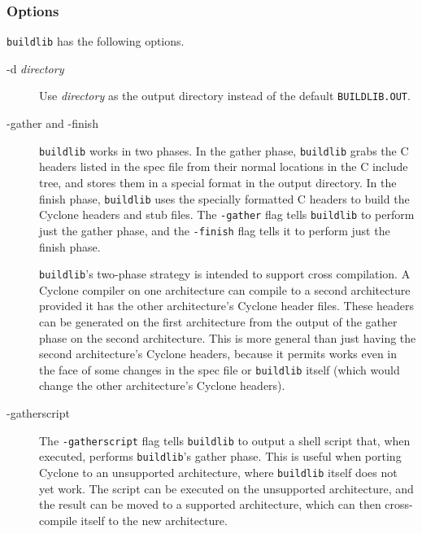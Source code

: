 \subsubsection*{Options}
\texttt{buildlib} has the following options.
\begin{description}
\item[-d \textit{directory}]
Use \textit{directory} as the output directory instead of the default
\texttt{BUILDLIB.OUT}.

\item[-gather and -finish]
\texttt{buildlib} works in two phases.  In the gather
phase, \texttt{buildlib} grabs the C headers listed in the spec file
from their normal locations in the C include tree, and stores them in
a special format in the output directory.  In the finish phase,
\texttt{buildlib} uses the specially formatted C headers to build the
Cyclone headers and stub files.  The \texttt{-gather} flag tells
\texttt{buildlib} to perform just the gather phase, and the
\texttt{-finish} flag tells it to perform just the finish phase.

\texttt{buildlib}'s two-phase strategy is intended to support cross
compilation.  A Cyclone compiler on one architecture can compile to a
second architecture provided it has the other architecture's Cyclone
header files.  These headers can be generated on the first
architecture from the output of the gather phase on the second
architecture.  This is more general than just having the second
architecture's Cyclone headers, because it permits works even in the
face of some changes in the spec file or \texttt{buildlib} itself
(which would change the other architecture's Cyclone headers).

\item[-gatherscript]
The \texttt{-gatherscript} flag tells \texttt{buildlib} to output a
shell script that, when executed, performs \texttt{buildlib}'s gather
phase.  This is useful when porting Cyclone to an unsupported
architecture, where \texttt{buildlib} itself does not yet work.  The
script can be executed on the unsupported architecture, and the result
can be moved to a supported architecture, which can then cross-compile
itself to the new architecture.

\end{description}

